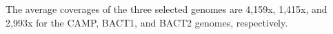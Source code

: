 The average coverages of the three selected genomes are 4,159x, 1,415x, and 2,993x for the CAMP, BACT1, and BACT2 genomes, respectively. 